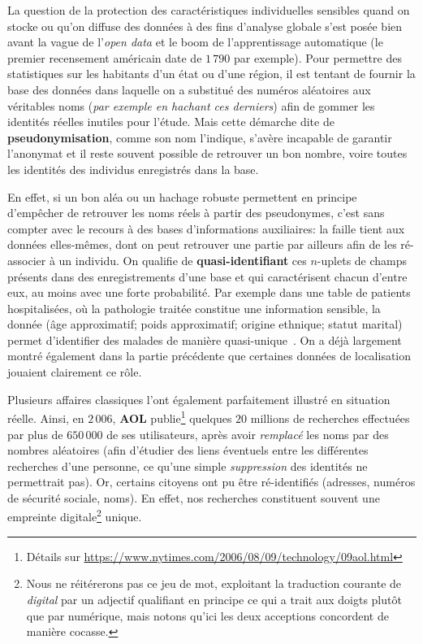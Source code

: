 \documentclass[a4paper,11pt]{article} %
\begin{document}
La question de la protection des caractéristiques individuelles sensibles quand on stocke ou qu'on diffuse des données à des fins d'analyse globale s'est posée bien avant la vague de l'\emph{open data} et le boom de l'apprentissage automatique (le premier recensement américain date de $1\,790$ par exemple).
Pour permettre des statistiques sur les habitants d'un état ou d'une région, il est tentant de fournir la base des données dans laquelle on a substitué des numéros aléatoires aux véritables noms (\emph{par exemple en \og hachant\fg{} ces derniers}) afin de gommer les identités réelles inutiles pour l'étude. 
Mais cette démarche dite de \textbf{pseudonymisation}, comme son nom l'indique, s'avère incapable de garantir l'anonymat et il reste souvent possible de retrouver un bon nombre, voire toutes les identités des individus enregistrés dans la base.

En effet, si un bon aléa ou un hachage robuste permettent en principe d'empêcher de retrouver les noms réels à partir des pseudonymes, c'est sans compter avec le recours à des bases d'informations auxiliaires: la faille tient aux données elles-mêmes, dont on peut retrouver une partie par ailleurs afin de les ré-associer à un individu. 
On qualifie de \textbf{quasi-identifiant} ces $n$-uplets de champs présents dans des enregistrements d'une base et qui caractérisent chacun d'entre eux, au moins avec une forte probabilité. 
Par exemple dans une table de patients hospitalisées, où la pathologie traitée constitue une information sensible, la donnée (âge approximatif; poids approximatif; origine ethnique; statut marital) permet d'identifier des malades de manière quasi-unique~\cite{DN03}. On a déjà largement montré également dans la partie précédente que certaines données de localisation jouaient clairement ce rôle.

Plusieurs affaires classiques l'ont également parfaitement illustré en situation réelle. Ainsi, en $2\,006$, \textbf{AOL} publie\footnote{Détails sur \url{https://www.nytimes.com/2006/08/09/technology/09aol.html}} quelques $20$ millions de recherches effectuées par plus de $650\,000$ de ses utilisateurs, après avoir \emph{remplacé} les noms par des nombres aléatoires (afin d'étudier des liens éventuels entre les différentes recherches d'une personne, ce qu'une simple \emph{suppression} des identités ne permettrait pas). Or, certains citoyens ont pu être ré-identifiés (adresses, numéros de sécurité sociale, noms). En effet, nos recherches constituent souvent une \og empreinte digitale\footnote{Nous ne réitérerons pas ce jeu de mot, exploitant la traduction courante de \og \emph{digital}\fg{} par un adjectif qualifiant en principe ce qui a trait aux doigts plutôt que par \og numérique\fg{}, mais notons qu'ici les deux acceptions concordent de manière cocasse.}\fg{} unique. 
\end{document}
